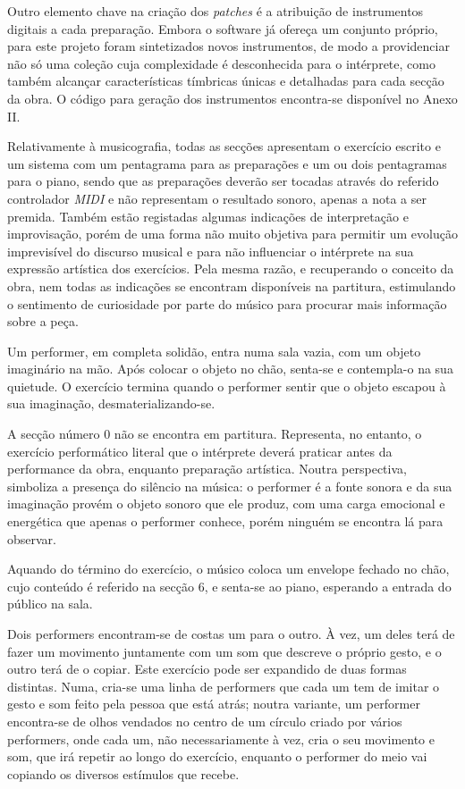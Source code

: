 \documentclass[../main.tex]{subfiles}
\begin{document}
Outro elemento chave na criação dos \textsl{patches} é a atribuição de instrumentos digitais a cada preparação. Embora o software já ofereça um conjunto próprio, para este projeto foram sintetizados novos instrumentos, de modo a providenciar não só uma coleção cuja complexidade é desconhecida para o intérprete, como também alcançar características tímbricas únicas e detalhadas para cada secção da obra. O código para geração dos instrumentos encontra-se disponível no Anexo II.

Relativamente à musicografia, todas as secções apresentam o exercício escrito e um sistema com um pentagrama para as preparações e um ou dois pentagramas para o piano, sendo que as preparações deverão ser tocadas através do referido controlador \textsl{MIDI} e não representam o resultado sonoro, apenas a nota a ser premida. Também estão registadas algumas indicações de interpretação e improvisação, porém de uma forma não muito objetiva para permitir um evolução imprevisível do discurso musical e para não influenciar o intérprete na sua expressão artística dos exercícios. Pela mesma razão, e recuperando o conceito da obra, nem todas as indicações se encontram disponíveis na partitura, estimulando o sentimento de curiosidade por parte do músico para procurar mais informação sobre a peça.

\begin{performex}
    Um performer, em completa solidão, entra numa sala vazia, com um objeto imaginário na mão. Após colocar o objeto no chão, senta-se e contempla-o na sua quietude. O exercício termina quando o performer sentir que o objeto escapou à sua imaginação, desmaterializando-se.
\end{performex}

A secção número 0 não se encontra em partitura. Representa, no entanto, o exercício performático literal que o intérprete deverá praticar antes da performance da obra, enquanto preparação artística. Noutra perspectiva, simboliza a presença do silêncio na música: o performer é a fonte sonora e da sua imaginação provém o objeto sonoro que ele produz, com uma carga emocional e energética que apenas o performer conhece, porém ninguém se encontra lá para observar.

Aquando do término do exercício, o músico coloca um envelope fechado no chão, cujo conteúdo é referido na secção 6, e senta-se ao piano, esperando a entrada do público na sala.

\begin{performex}
    Dois performers encontram-se de costas um para o outro. À vez, um deles terá de fazer um movimento juntamente com um som que descreve o próprio gesto, e o outro terá de o copiar. Este exercício pode ser expandido de duas formas distintas. Numa, cria-se uma linha de performers que cada um tem de imitar o gesto e som feito pela pessoa que está atrás; noutra variante, um performer encontra-se de olhos vendados no centro de um círculo criado por vários performers, onde cada um, não necessariamente à vez, cria o seu movimento e som, que irá repetir ao longo do exercício, enquanto o performer do meio vai copiando os diversos estímulos que recebe.
\end{performex}
\end{document}
